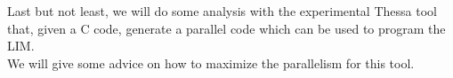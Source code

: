 \documentclass[12pt]{report}
\begin{document}
Last but not least, we will do some analysis with the experimental Thessa tool that, given a C code,  generate a parallel code which can be used to program the LIM.\\
We will give some advice on how to maximize the parallelism for this tool.
 	
	 
	
\end{document}
